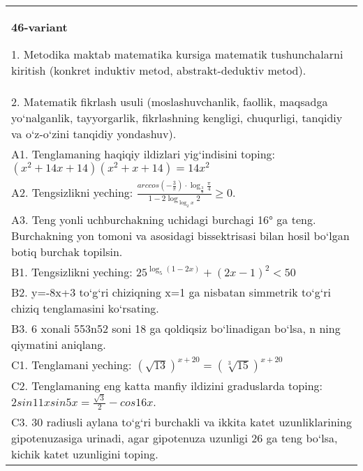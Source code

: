 \documentclass{article}
\begin{document}
\begin{tabular}{m{17cm}}
\textbf{46-variant}

1. Metodika maktab matematika kursiga matematik tushunchalarni kiritish (konkret induktiv metod, abstrakt-deduktiv metod). \\
2. Matematik fikrlash usuli (moslashuvchanlik, faollik, maqsadga yo‘nalganlik, tayyorgarlik, fikrlashning kengligi, chuqurligi, tanqidiy va o‘z-o‘zini tanqidiy yondashuv). \\
A1. Tenglamaning haqiqiy ildizlari yig‘indisini toping: \((x^2 + 14x + 14) (x^2 + x + 14) = 14x^2\) \\
A2. Tengsizlikni yeching: \(\frac{arccos (- \frac{3}{\pi}) \cdot \log_{\frac{3}{\pi}}\frac{\pi}{4}}{1 - 2\log_{\log_{2}x}2} \geq 0\). \\
A3. Teng yonli uchburchakning uchidagi burchagi 16° ga teng. Burchakning yon tomoni va asosidagi bissektrisasi bilan hosil bo‘lgan botiq burchak topilsin. \\
B1. Tengsizlikni yeching: \(25^{\log_{5}{ (1 - 2x) }} + { (2x - 1) }^{2} < 50\) \\
B2. y=-8x+3 to‘g‘ri chiziqning x=1 ga nisbatan simmetrik to‘g‘ri chiziq tenglamasini ko‘rsating. \\
B3. 6 xonali 553n52 soni 18 ga qoldiqsiz bo‘linadigan bo‘lsa, n ning qiymatini aniqlang. \\
C1. Tenglamani yeching: \((\sqrt{13}) ^{x + 20} = (\sqrt[3]{15}) ^{x + 20}\) \\
C2. Tenglamaning eng katta manfiy ildizini graduslarda toping: \(2sin11xsin5x = \frac{\sqrt{3}}{2} - cos16x\). \\
C3. 30 radiusli aylana to‘g‘ri burchakli va ikkita katet uzunliklarining gipotenuzasiga urinadi, agar gipotenuza uzunligi 26 ga teng bo‘lsa, kichik katet uzunligini toping. \\

\end{tabular}
\vspace{1cm}
\end{document}
